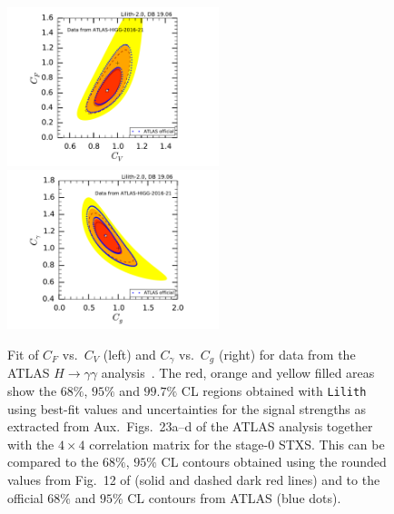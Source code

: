 \begin{figure}[h!]\centering
\includegraphics[width=0.55\textwidth]{validation/ATLAS/HIGG-2016-21-CVCF.pdf}%
\hspace{-16mm}\includegraphics[width=0.55\textwidth]{validation/ATLAS/HIGG-2016-21-CgCGa.pdf}%
\vspace*{-2mm}
\caption{Fit of $C_F$ vs.\ $C_V$ (left) and $C_\gamma$ vs.\ $C_g$ (right) for data from the ATLAS $H\to\gamma\gamma$ analysis~\cite{Aaboud:2018xdt}. The red, orange and yellow filled areas show the 
$68\%$,  $95\%$ and $99.7\%$ CL regions obtained with {\tt Lilith} using best-fit values and uncertainties for the signal strengths 
as extracted from Aux.\ Figs.~23a--d of the ATLAS analysis together with the $4\times 4$ correlation matrix for the stage-0 STXS. 
This can be compared to the $68\%$,  $95\%$ CL contours obtained using the rounded values from Fig.~12 of \cite{Sirunyan:2018koj} 
(solid and dashed dark red lines) and to the official $68\%$ and $95\%$ CL contours from ATLAS (blue dots).}
\label{fig:validation_atlas_gamgam}
\end{figure}
 

